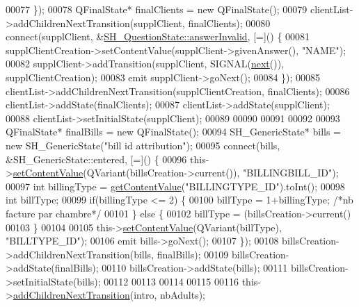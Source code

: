 \begin{DoxyCode}
00077     \});
00078     QFinalState* finalClients = \textcolor{keyword}{new} QFinalState();
00079     clientList->addChildrenNextTransition(supplClient, finalClients);
00080     connect(supplClient, &\hyperlink{classSimpleHotel_1_1SH__QuestionState_a69caaa66c68de820a5afa9584f24ca31}{SH\_QuestionState::answerInvalid}, [=]() \{
00081         supplClientCreation->setContentValue(supplClient->givenAnswer(), \textcolor{stringliteral}{"NAME"});
00082         supplClient->addTransition(supplClient, SIGNAL(\hyperlink{classSimpleHotel_1_1SH__GenericStateMachine_a2de14d4920ae8c10b70c2d73fc2d4a93}{next}()), supplClientCreation);
00083         emit supplClient->goNext();
00084     \});
00085     clientList->addChildrenNextTransition(supplClientCreation, finalClients);
00086     clientList->addState(finalClients);
00087     clientList->addState(supplClient);
00088     clientList->setInitialState(supplClient);
00089 
00090 
00091 
00092 
00093     QFinalState* finalBills = \textcolor{keyword}{new} QFinalState();
00094     SH\_GenericState* bills = \textcolor{keyword}{new} SH\_GenericState(\textcolor{stringliteral}{"bill id attribution"});
00095     connect(bills, &SH\_GenericState::entered, [=]() \{
00096         this->\hyperlink{classSimpleHotel_1_1SH__InOutStateMachine_aaf92da452f6cf7cc57aa9e60f88322e4}{setContentValue}(QVariant(billsCreation->current()), \textcolor{stringliteral}{"BILLINGBILL\_ID"});
00097         \textcolor{keywordtype}{int} billingType = \hyperlink{classSimpleHotel_1_1SH__InOutStateMachine_a4e2afab69163c7ce53dd6a40c793d5dc}{getContentValue}(\textcolor{stringliteral}{"BILLINGTYPE\_ID"}).toInt();
00098         \textcolor{keywordtype}{int} billType;
00099         \textcolor{keywordflow}{if}(billingType <= 2) \{
00100             billType = 1+billingType; \textcolor{comment}{/*nb facture par chambre*/}
00101         \} \textcolor{keywordflow}{else} \{
00102             billType = (billsCreation->current() %
00103         \}
00104 
00105         this->\hyperlink{classSimpleHotel_1_1SH__InOutStateMachine_aaf92da452f6cf7cc57aa9e60f88322e4}{setContentValue}(QVariant(billType), \textcolor{stringliteral}{"BILLTYPE\_ID"});
00106         emit bills->goNext();
00107     \});
00108     billsCreation->addChildrenNextTransition(bills, finalBills);
00109     billsCreation->addState(finalBills);
00110     billsCreation->addState(bills);
00111     billsCreation->setInitialState(bills);
00112 
00113 
00114 
00115 
00116     this->\hyperlink{classSimpleHotel_1_1SH__InOutStateMachine_aaf5afe04d6e4d3d5ebf0b5f1b00eddf1}{addChildrenNextTransition}(intro, nbAdults);

\end{DoxyCode}
